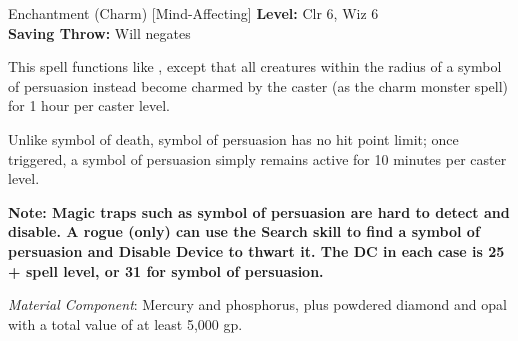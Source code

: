 {Enchantment (Charm) [Mind-Affecting]}
{
	\textbf{Level:}
	Clr 6, Wiz 6\\
	\textbf{Saving Throw:}
	Will negates\\
}
{
	This spell functions like , except that all creatures within the radius of a symbol of persuasion instead become charmed by the caster (as the charm monster spell) for 1 hour per caster level.

	Unlike symbol of death, symbol of persuasion has no hit point limit; once triggered, a symbol of persuasion simply remains active for 10 minutes per caster level.

	\textbf{Note: Magic traps such as symbol of persuasion are hard to detect and disable. A rogue (only) can use the Search skill to find a symbol of persuasion and Disable Device to thwart it. The DC in each case is 25 + spell level, or 31 for symbol of persuasion.}

	\textit{Material Component}:
	Mercury and phosphorus, plus powdered diamond and opal with a total value of at least 5,000 gp.

}
